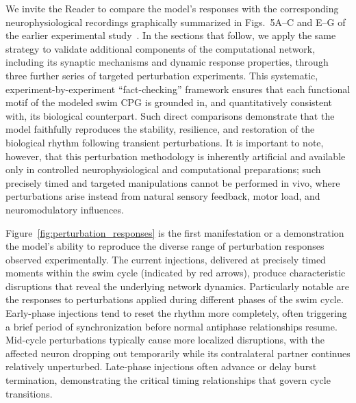 \documentclass[nofootinbib,aip,amsmath,amssymb,reprint,twocolumn,10pt]{revtex4-2}
\begin{document}
We invite the Reader to compare the model's responses with the corresponding neurophysiological recordings graphically summarized in Figs.~5A--C and E--G of the earlier experimental study~\cite{SakuraiKatz2016}. In the sections that follow, we apply the same strategy to validate additional components of the computational network, including its synaptic mechanisms and dynamic response properties, through three further series of targeted perturbation experiments. This systematic, experiment-by-experiment ``fact-checking'' framework ensures that each functional motif of the modeled swim CPG is grounded in, and quantitatively consistent with, its biological counterpart. Such direct comparisons demonstrate that the model faithfully reproduces the stability, resilience, and restoration of the biological rhythm following transient perturbations. It is important to note, however, that this perturbation methodology is inherently artificial and available only in controlled neurophysiological and computational preparations; such precisely timed and targeted manipulations cannot be performed in vivo, where perturbations arise instead from natural sensory feedback, motor load, and neuromodulatory influences.

Figure~\ref{fig:perturbation_responses} is the first manifestation or a demonstration the model's ability to reproduce the diverse range of perturbation responses observed experimentally. The current injections, delivered at precisely timed moments within the swim cycle (indicated by red arrows), produce characteristic disruptions that reveal the underlying network dynamics. Particularly notable are the responses to perturbations applied during different phases of the swim cycle. Early-phase injections tend to reset the rhythm more completely, often triggering a brief period of synchronization before normal antiphase relationships resume. Mid-cycle perturbations typically cause more localized disruptions, with the affected neuron dropping out temporarily while its contralateral partner continues relatively unperturbed. Late-phase injections often advance or delay burst termination, demonstrating the critical timing relationships that govern cycle transitions.
\end{document}
